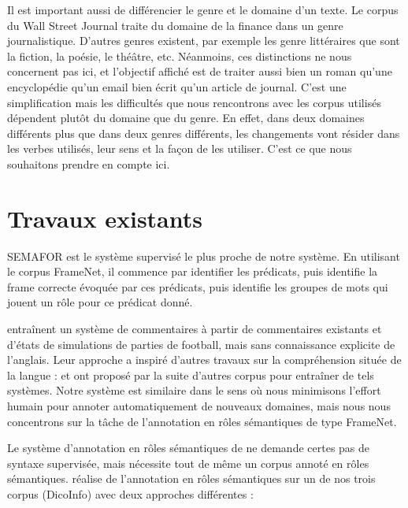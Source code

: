 

Il est important aussi de différencier le genre et le domaine d'un texte. Le
corpus du Wall Street Journal traite du domaine de la finance dans un genre
journalistique. D'autres genres existent, par exemple les genre littéraires que
sont la fiction, la poésie, le théâtre, etc. Néanmoins, ces distinctions ne
nous concernent pas ici, et l'objectif affiché est de traiter aussi bien un
roman qu'une encyclopédie qu'un email bien écrit qu'un article de journal.
C'est une simplification mais les difficultés que nous rencontrons avec les
corpus utilisés dépendent plutôt du domaine que du genre. En effet, dans deux
domaines différents plus que dans deux genres différents, les changements vont
résider dans les verbes utilisés, leur sens et la façon de les utiliser. C'est
ce que nous souhaitons prendre en compte ici.

\section{Travaux existants}

SEMAFOR \citep{das2014frame} est le système supervisé le plus proche de notre
système. En utilisant le corpus FrameNet, il commence par identifier les
prédicats, puis identifie la frame correcte évoquée par ces prédicats, puis
identifie les groupes de mots qui jouent un rôle pour ce prédicat donné.

\cite{chen2008learning} entraînent un système de commentaires à partir de
commentaires existants et d'états de simulations de parties de football, mais
sans connaissance explicite de l'anglais. Leur approche a inspiré d'autres
travaux sur la compréhension située de la langue : \citep{bordes2010towards} et
\cite{richardson2012towards} ont proposé par la suite d'autres corpus pour
entraîner de tels systèmes. Notre système est similaire dans le sens où nous
minimisons l'effort humain pour annoter automatiquement de nouveaux domaines,
mais nous nous concentrons sur la tâche de l'annotation en rôles sémantiques de
type FrameNet.

Le système d'annotation en rôles sémantiques de \cite{gormley2014low} ne
demande certes pas de syntaxe supervisée, mais nécessite tout de même un corpus
annoté en rôles sémantiques. \cite{hadouche2011annotation} réalise de
l'annotation en rôles sémantiques sur un de nos trois corpus (DicoInfo) avec
deux approches différentes :

